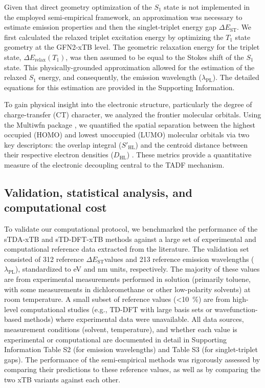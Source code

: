 \documentclass[journal=jcisd8,manuscript=article,keywords=true]{achemso}
\newcommand{\deltaest}{$\Delta E_{\text{ST}}$}
\begin{document}
Given that direct geometry optimization of the $S_1$ state is not implemented in the
employed semi-empirical framework, an approximation was necessary to estimate emission
properties and then the singlet-triplet energy gap $\Delta E_\text{ST}$. We first
calculated the relaxed triplet excitation energy by optimizing the
$T_1$ state geometry at the GFN2-xTB level. The geometric relaxation energy for the
triplet state, $\Delta E_{\text{relax}}(T_1)$, was then assumed to be equal to the Stokes
shift of the $S_1$ state. This physically-grounded approximation allowed for the
estimation of the relaxed $S_1$ energy, and consequently, the emission wavelength
($\lambda_{\text{PL}}$). The detailed equations for this estimation are provided in the
Supporting Information.%

To gain physical insight into the electronic structure, particularly the degree of
charge-transfer (CT) character, we analyzed the frontier molecular orbitals. Using the
Multiwfn package \cite{lu2024multiwfn}, we quantified the spatial separation between the
highest occupied (HOMO) and lowest unoccupied (LUMO) molecular orbitals via two key
descriptors: the overlap integral ($S'_{\text{HL}}$) and the centroid distance between
their respective electron densities ($D_{\text{HL}}$) \cite{Etienne2014, LeBahers2011}.
These metrics provide a quantitative measure of the electronic decoupling central to the
TADF mechanism.

\subsection{Validation, statistical analysis, and computational
cost}\label{sec:validation_and_cost}

To validate our computational protocol, we benchmarked the performance of the sTDA-xTB and
sTD-DFT-xTB methods against a large set of experimental and computational reference data extracted from the
literature. The validation set consisted of \num{312} reference \deltaest values and
\num{213} reference emission wavelengths ($\lambda_{\text{PL}}$), standardized to eV
and nm units, respectively. The majority of these values are from experimental measurements performed in solution (primarily toluene, with some measurements in 
dichloromethane or other low-polarity solvents) at room temperature. A small subset of reference values (\qty{<10}{\percent}) are from high-level computational 
studies (e.g., TD-DFT with large basis sets or wavefunction-based methods) where experimental data were unavailable. All data sources, measurement conditions 
(solvent, temperature), and whether each value is experimental or computational are documented in detail in Supporting Information Table S2 (for emission 
wavelengths) and Table S3 (for singlet-triplet gaps). The performance of the semi-empirical methods was rigorously
assessed by comparing their predictions to these reference values, as well as by
comparing the two xTB variants against each other.
\end{document}
